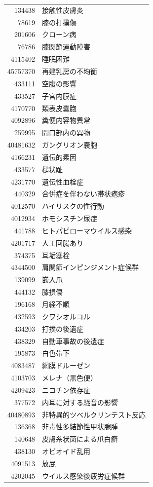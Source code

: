 \documentclass[
  11pt]{book}
\theoremstyle{definition}
\theoremstyle{definition}
\theoremstyle{definition}
\theoremstyle{definition}
\theoremstyle{remark}
\begin{document}
\begin{longtable}[]{@{}rl@{}}
134438 & 接触性皮膚炎 \\
78619 & 膝の打撲傷 \\
201606 & クローン病 \\
76786 & 膝関節運動障害 \\
4115402 & 睡眠困難 \\
45757370 & 再建乳房の不均衡 \\
433111 & 空腹の影響 \\
433527 & 子宮内膜症 \\
4170770 & 類表皮嚢胞 \\
4092896 & 糞便内容物異常 \\
259995 & 開口部内の異物 \\
40481632 & ガングリオン嚢胞 \\
4166231 & 遺伝的素因 \\
433577 & 槌状趾 \\
4231770 & 遺伝性血栓症 \\
440329 & 合併症を伴わない帯状疱疹 \\
4012570 & ハイリスクの性行動 \\
4012934 & ホモシスチン尿症 \\
441788 & ヒトパピローマウイルス感染 \\
4201717 & 人工回腸あり \\
374375 & 耳垢塞栓 \\
4344500 & 肩関節インピンジメント症候群 \\
139099 & 嵌入爪 \\
444132 & 膝損傷 \\
196168 & 月経不順 \\
432593 & クワシオルコル \\
434203 & 打撲の後遺症 \\
438329 & 自動車事故の後遺症 \\
195873 & 白色帯下 \\
4083487 & 網膜ドルーゼン \\
4103703 & メレナ（黒色便） \\
4209423 & ニコチン依存症 \\
377572 & 内耳に対する騒音の影響 \\
40480893 & 非特異的ツベルクリンテスト反応 \\
136368 & 非毒性多結節性甲状腺腫 \\
140648 & 皮膚糸状菌による爪白癬 \\
438130 & オピオイド乱用 \\
4091513 & 放屁 \\
4202045 & ウイルス感染後疲労症候群 \\

\end{longtable}
\end{document}
